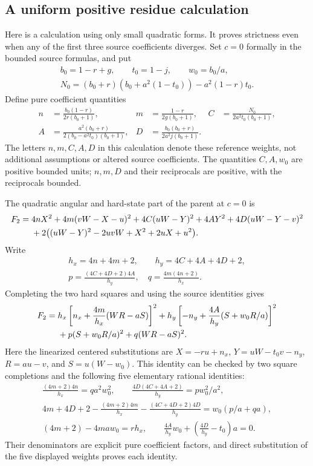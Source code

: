 \subsection{A uniform positive residue calculation}
Here is a calculation using only small quadratic forms.  It proves
strictness even when any of the first three source coefficients diverges.
Set $c=0$ formally in the bounded source formulas, and put
\[
\begin{gathered}
b_0=1-r+g,\qquad t_0=1-j,\qquad w_0=b_0/a,\\
N_0=(b_0+r)(b_0+a^2(1-t_0))-a^2(1-r)t_0.
\end{gathered}
\]
Define pure coefficient quantities
\begin{align*}
n&=\frac{b_0(1-r)}{2r(b_0+1)},&
m&=\frac{1-r}{2g(b_0+1)},&
C&=\frac{N_0}{2a^2t_0(b_0+1)},\\
A&=\frac{a^2(b_0+r)}{2(b_0-a^2t_0)(b_0+1)},&
D&=\frac{b_0(b_0+r)}{2a^2j(b_0+1)}.
\end{align*}
The letters $n,m,C,A,D$ in this calculation denote these reference
weights, not additional assumptions or altered source coefficients.
The quantities $C,A,w_0$ are positive bounded units; $n,m,D$ and their
reciprocals are positive, with the reciprocals bounded.

The quadratic angular and hard-state part of the parent at $c=0$ is
\begin{align}
F_2={}&4nX^2+4m(vW-X-u)^2+4C(uW-Y)^2
 +4AY^2+4D(uW-Y-v)^2\notag\\
&+2\bigl((uW-Y)^2-2uvW+X^2+2uX+u^2\bigr).
\label{p9f1235511111:eq:c2u-F2}
\end{align}
Write
\[
\begin{gathered}
h_x=4n+4m+2,\qquad h_y=4C+4A+4D+2,\\
p=\frac{(4C+4D+2)4A}{h_y},\quad
q=\frac{4m(4n+2)}{h_x}.
\end{gathered}
\]
Completing the two hard squares and using the source identities gives
\begin{align}
F_2={}&h_x\left[n_x+\frac{4m}{h_x}(WR-aS)\right]^2
 +h_y\left[-n_y+\frac{4A}{h_y}(S+w_0R/a)\right]^2\notag\\
&+p(S+w_0R/a)^2+q(WR-aS)^2.
\label{p9f1235511111:eq:c2u-F2-factor}
\end{align}
Here the linearized centered substitutions are
$X=-ru+n_x$, $Y=uW-t_0v-n_y$,
$R=au-v$, and $S=u(W-w_0)$.  This identity can be checked by two
square completions and the following five elementary rational identities:
\begin{gather*}
\frac{(4m+2)4n}{h_x}=qa^2w_0^2,\qquad
\frac{4D(4C+4A+2)}{h_y}=p w_0^2/a^2,\\
4m+4D+2-\frac{(4m+2)4m}{h_x}
 -\frac{(4C+4D+2)4D}{h_y}
 =w_0(p/a+qa),\\
(4m+2)-4maw_0=rh_x,\qquad
\frac{4A}{h_y}w_0+\left(\frac{4D}{h_y}-t_0\right)a=0.
\end{gather*}
Their denominators are explicit pure coefficient factors, and direct
substitution of the five displayed weights proves each identity.

